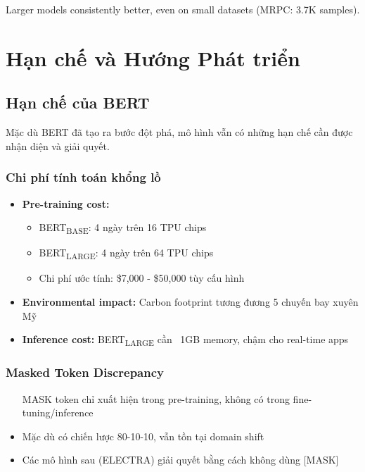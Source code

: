 Larger models consistently better, even on small datasets (MRPC: 3.7K samples).

\section{Hạn chế và Hướng Phát triển}
\label{sec:han_che_huong_phat_trien}

\subsection{Hạn chế của BERT}
\label{ssec:han_che_bert}
Mặc dù BERT đã tạo ra bước đột phá, mô hình vẫn có những hạn chế cần được nhận diện và giải quyết.

\subsubsection{Chi phí tính toán khổng lồ}
\begin{itemize}
    \item \textbf{Pre-training cost:}
    \begin{itemize}
        \item BERT\textsubscript{BASE}: 4 ngày trên 16 TPU chips
        \item BERT\textsubscript{LARGE}: 4 ngày trên 64 TPU chips
        \item Chi phí ước tính: \$7,000 - \$50,000 tùy cấu hình
    \end{itemize}
    \item \textbf{Environmental impact:} Carbon footprint tương đương 5 chuyến bay xuyên Mỹ
    \item \textbf{Inference cost:} BERT\textsubscript{LARGE} cần ~1GB memory, chậm cho real-time apps
\end{itemize}

\subsubsection{Masked Token Discrepancy}
\begin{itemize}
    \item [MASK] token chỉ xuất hiện trong pre-training, không có trong fine-tuning/inference
    \item Mặc dù có chiến lược 80-10-10, vẫn tồn tại domain shift
    \item Các mô hình sau (ELECTRA) giải quyết bằng cách không dùng [MASK]
\end{itemize}

